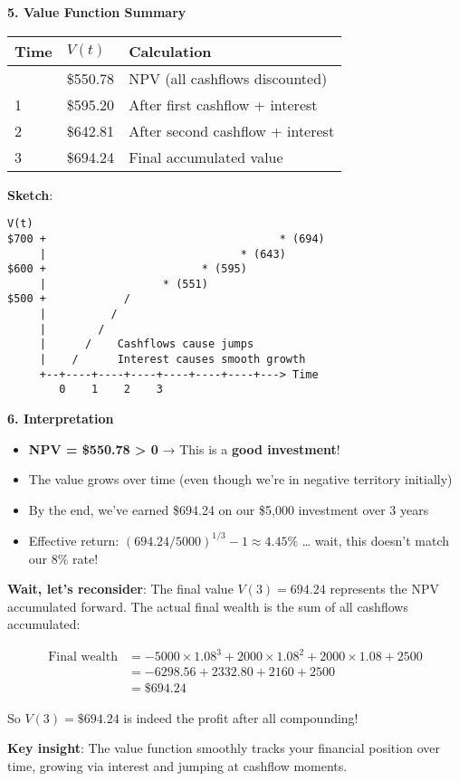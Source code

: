 \documentclass[
  letterpaper,
]{scrbook}
\providecommand{\tightlist}{%
  \setlength{\itemsep}{0pt}\setlength{\parskip}{0pt}}
\begin{document}
\begin{tcolorbox}
\textbf{5. Value Function Summary}

\begin{longtable}[]{@{}lll@{}}
\toprule\noalign{}
Time & \(V(t)\) & Calculation \\
\midrule\noalign{}
\endhead
\bottomrule\noalign{}
\endlastfoot
0 & \$550.78 & NPV (all cashflows discounted) \\
1 & \$595.20 & After first cashflow + interest \\
2 & \$642.81 & After second cashflow + interest \\
3 & \$694.24 & Final accumulated value \\
\end{longtable}

\FloatBarrier

\textbf{Sketch}:

\begin{verbatim}
V(t)
$700 +                                    * (694)
     |                              * (643)
$600 +                        * (595)
     |                  * (551)
$500 +            /
     |          /
     |        /  
     |      /    Cashflows cause jumps
     |    /      Interest causes smooth growth
     +--+----+----+----+----+----+----+---> Time
        0    1    2    3
\end{verbatim}

\textbf{6. Interpretation}

\begin{itemize}
\tightlist
\item
  \textbf{NPV = \$550.78 \textgreater{} 0} → This is a \textbf{good
  investment}!
\item
  The value grows over time (even though we're in negative territory
  initially)
\item
  By the end, we've earned \$694.24 on our \$5,000 investment over 3
  years
\item
  Effective return: \((694.24/5000)^{1/3} - 1 \approx 4.45\%\) \ldots{}
  wait, this doesn't match our 8\% rate!
\end{itemize}

\textbf{Wait, let's reconsider}: The final value \(V(3) = 694.24\)
represents the NPV accumulated forward. The actual final wealth is the
sum of all cashflows accumulated:

\[
\begin{aligned}
\text{Final wealth} &= -5000 \times 1.08^3 + 2000 \times 1.08^2 + 2000 \times 1.08 + 2500 \\
&= -6298.56 + 2332.80 + 2160 + 2500 \\
&= \$694.24
\end{aligned}
\]

So \(V(3) = \$694.24\) is indeed the profit after all compounding!

\textbf{Key insight}: The value function smoothly tracks your financial
position over time, growing via interest and jumping at cashflow
moments.

\end{tcolorbox}
\end{document}
